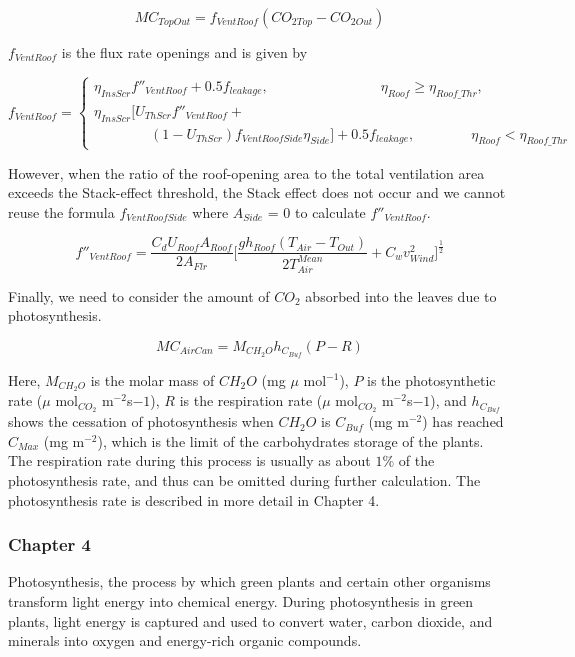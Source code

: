\documentclass[a4paper]{article}
\begin{document}
\begin{equation}
  MC_{TopOut} = f_{VentRoof}(CO_{2 Top} - CO_{2 Out})
\end{equation}

$f_{VentRoof}$ is the flux rate openings and is given by

$$ f_{VentRoof} = \begin{cases}
    \eta_{InsScr} f''_{VentRoof} + 0.5f_{leakage},  \qquad \qquad \qquad \qquad \eta_{Roof} \geq \eta_{Roof\_Thr} , \\
    \eta_{InsScr} [U_{ThScr}f''_{VentRoof} +                                                                        \\
    \qquad \qquad (1-U_{ThScr})f_{VentRoofSide} \eta_{Side} ] + 0.5 f_{leakage},  \qquad \qquad \eta_{Roof} < \eta_{Roof\_Thr}
  \end{cases}$$

However, when the ratio of the roof-opening area to the total ventilation area exceeds the Stack-effect threshold, the Stack effect does not occur and we cannot reuse the formula $f_{VentRoofSide}$ where $A_{Side}$ = 0 to
calculate $f''_{VentRoof}$.

$$f''_{VentRoof} = \frac{C_d U_{Roof} A_{Roof}}{2A_{Flr}} \Big[\frac{gh_{Roof}(T_{Air} - T_{Out})}{2T^{Mean}_{Air}} + C_wv^2_{Wind} \Big]^{ \frac{1}{2}}$$

Finally, we need to consider the amount of $CO_2$ absorbed into the leaves due to photosynthesis.

\begin{equation}
  MC_{AirCan} = M_{CH_2O} h_{C_{Buf}} (P - R)
\end{equation}

Here, $M_{CH_2O}$ is the molar mass of $CH_2O$ (mg $\mu$ mol$^{-1}$), $P$ is the photosynthetic rate ($\mu$ mol$_{CO_2}$ m$^{-2}$s${-1}$), $R$ is the respiration rate ($\mu$ mol$_{CO_2}$ m$^{-2}$s${-1}$), and $h_{C_{Buf}}$ shows the cessation of photosynthesis when $CH_2O$ is $C_{Buf}$ (mg m$^{-2}$) has reached $C_{Max}$ (mg m$^{-2}$), which is the limit of the carbohydrates storage of the plants. The respiration rate during this process is usually as about $1\%$ of the photosynthesis rate, and thus can be omitted during further calculation. The photosynthesis rate is described in more detail in Chapter 4.



\subsubsection{Chapter 4}
\setcounter{equation}{19}
Photosynthesis, the process by which green plants and certain other organisms transform light energy into chemical energy. During photosynthesis in green plants, light energy is captured and used to convert water, carbon dioxide, and minerals into oxygen and energy-rich organic compounds.
\end{document}
